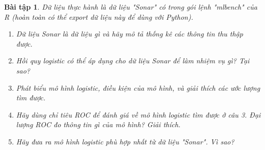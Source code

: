 \documentclass[14pt, a4paper]{article}
\theoremstyle{sltheorem}
\newtheorem{baitap}{Bài tập}
\theoremstyle{soltheorem}
\begin{document}
\begin{titlepage}





    \vfill %

\end{titlepage}

\nocite{*}

\newpage

\begin{baitap}
    Dữ liệu thực hành là dữ liệu "Sonar" có trong gói lệnh "mlbench" của R (hoàn toàn có thể export dữ liệu này để dùng với Python).
    \begin{enumerate}
        \item Dữ liệu Sonar là dữ liệu gì và hãy mô tả thống kê các thông tin thu thập được.
        \item Hồi quy logistic có thể áp dụng cho dữ liệu Sonar để làm nhiệm vụ gì? Tại sao?
        \item Phát biểu mô hình logistic, điều kiện của mô hình, và giải thích các ước lượng tìm được.
        \item Hãy dùng chỉ tiêu ROC để đánh giá về mô hình logistic tìm được ở câu 3. Đại lượng ROC đo thông tin gì của mô hình? Giải thích.
        \item Hãy đưa ra mô hình logistic phù hợp nhất từ dữ liệu "Sonar". Vì sao?
    \end{enumerate}
\end{baitap}
\end{document}
